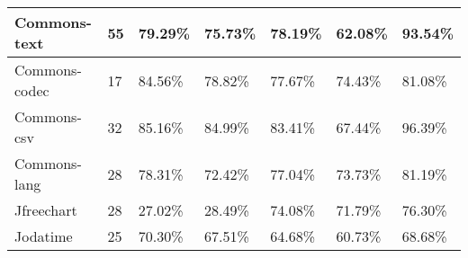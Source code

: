 \documentclass[../../main]{subfiles}
\begin{document}
\begin{table}[!htb]
\begin{tabular}{|l|l|l|l|l|l|l|}
Commons-text          & 55                   & 79.29\%                           & 75.73\%                                                & 78.19\%                            & 62.08\%                                                                                                                                    & 93.54\%                                                                                                                                    \\ \hline
Commons-codec         & 17                   & 84.56\%                           & 78.82\%                                                & 77.67\%                            & 74.43\%                                                                                                                                    & 81.08\%                                                                                                                                    \\ \hline
Commons-csv           & 32                   & 85.16\%                           & 84.99\%                                                & 83.41\%                            & 67.44\%                                                                                                                                    & 96.39\%                                                                                                                                    \\ \hline
Commons-lang          & 28                   & 78.31\%                           & 72.42\%                                                & 77.04\%                            & 73.73\%                                                                                                                                    & 81.19\%                                                                                                                                    \\ \hline
Jfreechart            & 28                   & 27.02\%                           & 28.49\%                                                & 74.08\%                            & 71.79\%                                                                                                                                    & 76.30\%                                                                                                                                    \\ \hline
Jodatime              & 25                   & 70.30\%                           & 67.51\%                                                & 64.68\%                            & 60.73\%                                                                                                                                    & 68.68\%                                                                                                                                    \\ \hline

\end{tabular}
\end{table}
\end{document}
